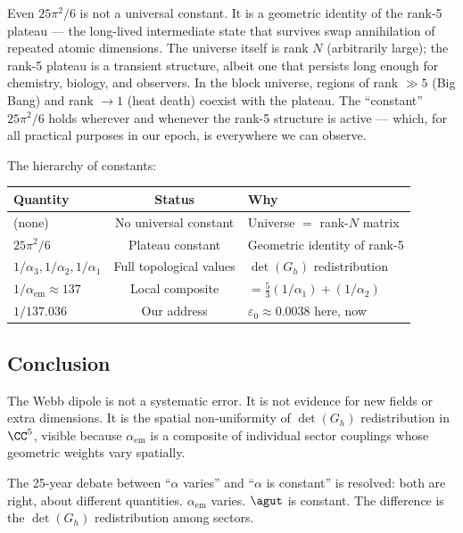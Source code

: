 \begin{remark}
Even $25\pi^2/6$ is not a universal constant. It is a geometric identity of the rank-5 plateau --- the long-lived intermediate state that survives swap annihilation of repeated atomic dimensions. The universe itself is rank $N$ (arbitrarily large); the rank-5 plateau is a transient structure, albeit one that persists long enough for chemistry, biology, and observers. In the block universe, regions of rank $\gg 5$ (Big Bang) and rank $\to 1$ (heat death) coexist with the plateau. The ``constant'' $25\pi^2/6$ holds wherever and whenever the rank-5 structure is active --- which, for all practical purposes in our epoch, is everywhere we can observe.

The hierarchy of constants:

\begin{center}
\begin{tabular}{lcl}
\hline
Quantity & Status & Why \\
\hline
(none) & No universal constant & Universe $=$ rank-$N$ matrix \\
$25\pi^2/6$ & Plateau constant & Geometric identity of rank-5 \\
$1/\alpha_3, 1/\alpha_2, 1/\alpha_1$ & Full topological values & $\det(G_h)$ redistribution \\
$1/\alpha_\text{em} \approx 137$ & Local composite & $= \tfrac{5}{3}(1/\alpha_1) + (1/\alpha_2)$ \\
$1/137.036$ & Our address & $\varepsilon_0 \approx 0.0038$ here, now \\
\hline
\end{tabular}
\end{center}
\end{remark}

\subsection{Conclusion}

The Webb dipole is not a systematic error. It is not evidence for new fields or extra dimensions. It is the spatial non-uniformity of $\det(G_h)$ redistribution in $\CC^5$, visible because $\alpha_\text{em}$ is a composite of individual sector couplings whose geometric weights vary spatially.

The 25-year debate between ``$\alpha$ varies'' and ``$\alpha$ is constant'' is resolved: both are right, about different quantities. $\alpha_\text{em}$ varies. $\agut$ is constant. The difference is the $\det(G_h)$ redistribution among sectors.

